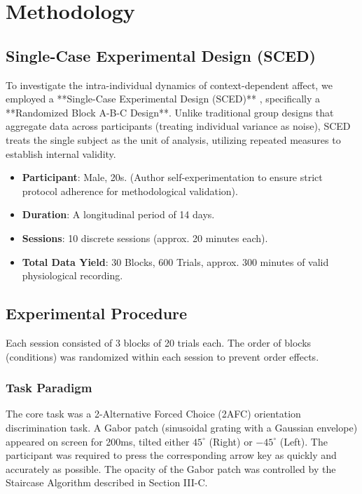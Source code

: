 \section{Methodology}

\subsection{Single-Case Experimental Design (SCED)}
To investigate the intra-individual dynamics of context-dependent affect, we employed a **Single-Case Experimental Design (SCED)** \cite{barlow_sced}, specifically a **Randomized Block A-B-C Design**. Unlike traditional group designs that aggregate data across participants (treating individual variance as noise), SCED treats the single subject as the unit of analysis, utilizing repeated measures to establish internal validity.

\begin{itemize}
    \item \textbf{Participant}: Male, 20s. (Author self-experimentation to ensure strict protocol adherence for methodological validation).
    \item \textbf{Duration}: A longitudinal period of 14 days.
    \item \textbf{Sessions}: 10 discrete sessions (approx. 20 minutes each).
    \item \textbf{Total Data Yield}: 30 Blocks, 600 Trials, approx. 300 minutes of valid physiological recording.
\end{itemize}

\subsection{Experimental Procedure}
Each session consisted of 3 blocks of 20 trials each. The order of blocks (conditions) was randomized within each session to prevent order effects.

\subsubsection{Task Paradigm}
The core task was a 2-Alternative Forced Choice (2AFC) orientation discrimination task. A Gabor patch (sinusoidal grating with a Gaussian envelope) appeared on screen for 200ms, tilted either $45^{\circ}$ (Right) or $-45^{\circ}$ (Left). The participant was required to press the corresponding arrow key as quickly and accurately as possible. The opacity of the Gabor patch was controlled by the Staircase Algorithm described in Section III-C.

